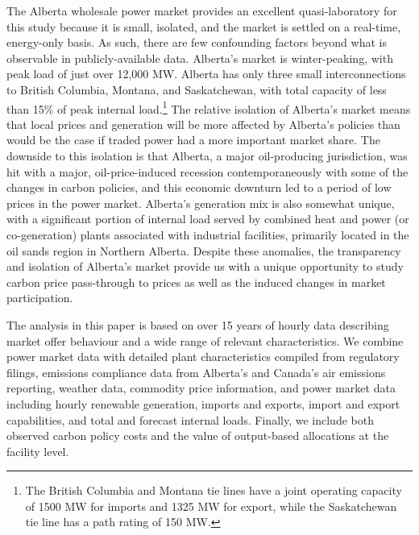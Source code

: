 \documentclass[12pt]{article}
\begin{document}
The Alberta wholesale power market provides an excellent quasi-laboratory for this study because it is small, isolated, and the market is settled on a real-time, energy-only basis. As such, there are few confounding factors beyond what is observable in publicly-available data. Alberta's market is winter-peaking, with peak load of just over 12,000 MW. Alberta has only three small interconnections to British Columbia, Montana, and Saskatchewan, with total capacity of less than 15\% of peak internal load.\footnote{The British Columbia and Montana tie lines have a joint operating capacity of 1500 MW for imports and 1325 MW for export, while the Saskatchewan tie line has a path rating of 150 MW.} The relative isolation of Alberta's market means that local prices and generation will be more affected by Alberta's policies than would be the case if traded power had a more important market share. The downside to this isolation is that Alberta, a major oil-producing jurisdiction, was hit with a major, oil-price-induced recession contemporaneously with some of the changes in carbon policies, and this economic downturn led to a period of low prices in the power market. Alberta's generation mix is also somewhat unique, with a significant portion of internal load served by combined heat and power (or co-generation) plants associated with industrial facilities, primarily located in the oil sands region in Northern Alberta. Despite these anomalies, the transparency and isolation of Alberta's market provide us with a unique opportunity to study carbon price pass-through to prices as well as the induced changes in market participation.

The analysis in this paper is based on over 15 years of hourly data describing market offer behaviour and a wide range of relevant characteristics. We combine power market data with detailed plant characteristics compiled from regulatory filings, emissions compliance data from Alberta's and Canada's air emissions reporting, weather data, commodity price information, and power market data including hourly renewable generation, imports and exports, import and export capabilities, and total and forecast internal loads. Finally, we include both observed carbon policy costs and the value of output-based allocations at the facility level.
\end{document}
